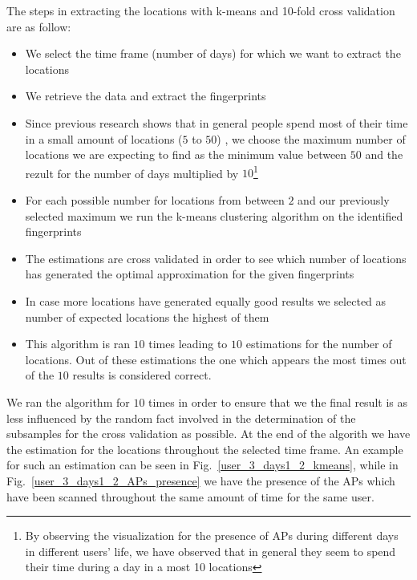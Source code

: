 The steps in extracting the locations with k-means and 10-fold cross validation
are as follow:
\begin{itemize}
  \item We select the time frame (number of days) for which we want to extract
  the locations
  \item We retrieve the data and extract the fingerprints
  \item Since previous research shows that in general people spend most of their
  time in a small amount of locations ($5$ to $50$) \cite{Barabasi08}, we choose
  the maximum number of locations we are expecting to find as the minimum value
  between $50$ and the rezult for the number of days multiplied by
  $10$\footnote{By observing the visualization for the presence of APs during
  different days in different users' life, we have observed that in general
  they seem to spend their time during a day in a most 10 locations}
  \item For each possible number for locations from between $2$ and our
  previously selected maximum we run the k-means clustering algorithm on the
  identified fingerprints
  \item The estimations are cross validated in order to see which number of
  locations has generated the optimal approximation for the given fingerprints
  \item In case more locations have generated equally good results we selected
  as number of expected locations the highest of them
  \item This algorithm is ran $10$ times leading to $10$ estimations for the
  number of locations. Out of these estimations the one which appears the most times
  out of the $10$ results is considered correct.
\end{itemize}

We ran the algorithm for $10$ times in order to ensure that we the final result
is as less influenced by the random fact involved in the determination of the
subsamples for the cross validation as possible. At the end of the algorith we
have the estimation for the locations throughout the selected time frame. An
example for such an estimation can be seen in Fig.~\ref{user_3_days1_2_kmeans},
while in Fig.~\ref{user_3_days1_2_APs_presence} we have the presence of the APs
which have been scanned throughout the same amount of time for the same user.

